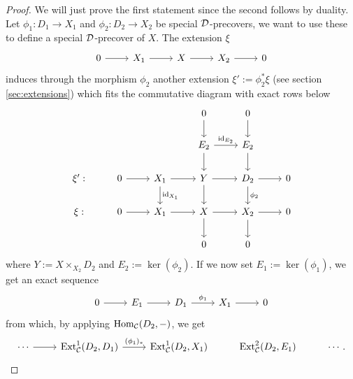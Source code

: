 \begin{proof}
    We will just prove the first statement since the second follows by duality. \\  
    Let $\phi_1\colon D_1 \longrightarrow X_1$ and $\phi_2\colon D_2 \longrightarrow X_2$ be special $\mathcal{D}$-precovers, we want to use these to define a special $\mathcal{D}$-precover of $X$. The extension $\xi$
    \[\begin{tikzcd}
        0 & {X_1} & X & {X_2} & 0
        \arrow[from=1-1, to=1-2]
        \arrow[from=1-2, to=1-3]
        \arrow[from=1-3, to=1-4]
        \arrow[from=1-4, to=1-5]
    \end{tikzcd}\]
    induces through the morphism $\phi_2$ another extension $\xi' := \phi_2^* \xi$ (see section \ref{sec:extensions}) which fits the commutative diagram with exact rows below
    \[\begin{tikzcd}
        &&& 0 & 0 & \\
        &&& {E_2} & {E_2} \\
        {\xi':} & 0 & {X_1} & Y & {D_2} & 0 \\
        {\xi:} & 0 & {X_1} & X & {X_2} & 0 \\
        &&& 0 & 0
        \arrow[from=1-4, to=2-4]
        \arrow[from=1-5, to=2-5]
        \arrow["{\id_{E_2}}", from=2-4, to=2-5]
        \arrow[from=2-4, to=3-4]
        \arrow[from=2-5, to=3-5]
        \arrow[from=3-2, to=3-3]
        \arrow[from=3-3, to=3-4]
        \arrow["{\id_{X_1}}", from=3-3, to=4-3]
        \arrow[from=3-4, to=3-5]
        \arrow[from=3-4, to=4-4]
        \arrow[from=3-5, to=3-6]
        \arrow["{\phi_2}", from=3-5, to=4-5]
        \arrow[from=4-2, to=4-3]
        \arrow[from=4-3, to=4-4]
        \arrow[from=4-4, to=4-5]
        \arrow[from=4-4, to=5-4]
        \arrow[from=4-5, to=4-6]
        \arrow[from=4-5, to=5-5]
    \end{tikzcd}\]
    where $Y := X \times_{X_2} D_2$ and $E_2 := \ker(\phi_2)$. If we now set $E_1:= \ker(\phi_1)$, we get an exact sequence 
    \[\begin{tikzcd}
        0 & {E_1} & {D_1} & {X_1} & 0
        \arrow[from=1-1, to=1-2]
        \arrow[from=1-2, to=1-3]
        \arrow["{\phi_1}", from=1-3, to=1-4]
        \arrow[from=1-4, to=1-5]
    \end{tikzcd}\]
    from which, by applying $\mathrm{Hom}_{\mathcal{C}}(D_2, {-})$, we get
    \[\begin{tikzcd}
        \cdots & {\Ext^1_\C(D_2,D_1)} & {\Ext^1_\C(D_2,X_1)} & {\Ext^2_\C(D_2,E_1)} & {\cdots.}
        \arrow[from=1-1, to=1-2]
        \arrow["{(\phi_1)_*}", from=1-2, to=1-3]

\end{tikzcd}\]
\end{proof}
